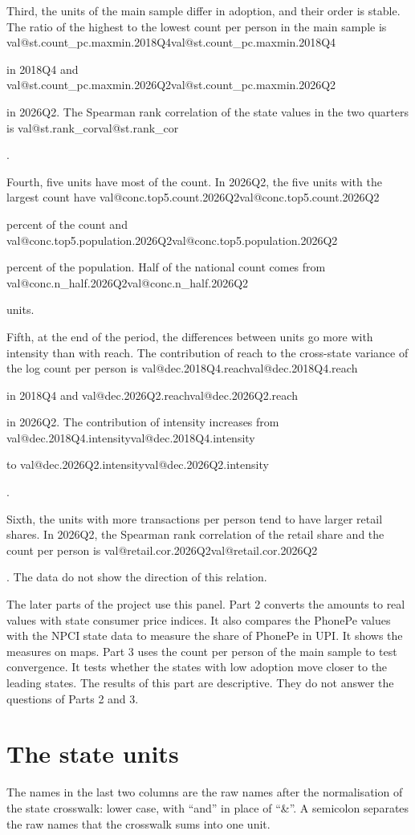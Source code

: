 \documentclass[11pt,a4paper]{article}
\makeatletter
\newcommand{\val}[1]{\ifcsname val@#1\endcsname\csname val@#1\endcsname\else
  \PackageError{study}{Unknown value key `#1'}{Run Rscript src/R/part1_study.R}\fi}
\makeatother
\begin{document}
Third, the units of the main sample differ in adoption, and their order is stable. The ratio of the highest to the lowest count per person in the main sample is \val{st.count_pc.maxmin.2018Q4} in 2018Q4 and \val{st.count_pc.maxmin.2026Q2} in 2026Q2. The Spearman rank correlation of the state values in the two quarters is \val{st.rank_cor}.

Fourth, five units have most of the count. In 2026Q2, the five units with the largest count have \val{conc.top5.count.2026Q2} percent of the count and \val{conc.top5.population.2026Q2} percent of the population. Half of the national count comes from \val{conc.n_half.2026Q2} units.

Fifth, at the end of the period, the differences between units go more with intensity than with reach. The contribution of reach to the cross-state variance of the log count per person is \val{dec.2018Q4.reach} in 2018Q4 and \val{dec.2026Q2.reach} in 2026Q2. The contribution of intensity increases from \val{dec.2018Q4.intensity} to \val{dec.2026Q2.intensity}.

Sixth, the units with more transactions per person tend to have larger retail shares. In 2026Q2, the Spearman rank correlation of the retail share and the count per person is \val{retail.cor.2026Q2}. The data do not show the direction of this relation.

The later parts of the project use this panel. Part 2 converts the amounts to real values with state consumer price indices. It also compares the PhonePe values with the NPCI state data to measure the share of PhonePe in UPI. It shows the measures on maps. Part 3 uses the count per person of the main sample to test convergence. It tests whether the states with low adoption move closer to the leading states. The results of this part are descriptive. They do not answer the questions of Parts 2 and 3.




\appendix
\section{The state units}\label{app:units}
The names in the last two columns are the raw names after the normalisation of the state crosswalk: lower case, with ``and'' in place of ``\&''. A semicolon separates the raw names that the crosswalk sums into one unit.

\small

\normalsize
\end{document}
